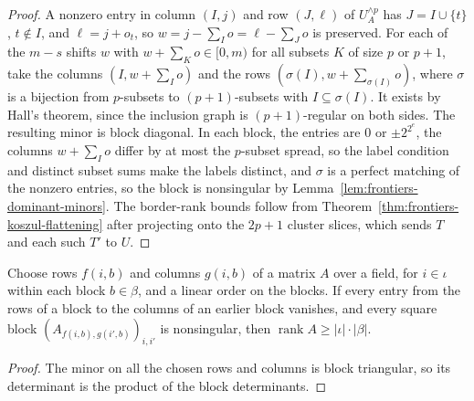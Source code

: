 \begin{proof}
  \leanok
  A nonzero entry in column $(I, j)$ and row $(J, \ell)$ of $U_A^{\wedge p}$ has
  $J = I \cup \{t\}$, $t \notin I$, and $\ell = j + o_t$, so
  $w = j - \sum_I o = \ell - \sum_J o$ is preserved. For each of the $m - s$ shifts $w$
  with $w + \sum_K o \in [0, m)$ for all subsets $K$ of size $p$ or $p + 1$, take the
  columns $(I, w + \sum_I o)$ and the rows $(\sigma(I), w + \sum_{\sigma(I)} o)$, where
  $\sigma$ is a bijection from $p$-subsets to $(p+1)$-subsets with $I \subseteq \sigma(I)$.
  It exists by Hall's theorem, since the inclusion graph is $(p+1)$-regular on both sides.
  The resulting minor is block diagonal. In each block, the entries are $0$ or
  $\pm 2^{2^{e}}$, the columns $w + \sum_I o$ differ by at most the $p$-subset spread, so
  the label condition and distinct subset sums make the labels distinct, and $\sigma$ is a
  perfect matching of the nonzero entries, so the block is nonsingular by
  Lemma~\ref{lem:frontiers-dominant-minors}. The border-rank bounds follow from
  Theorem~\ref{thm:frontiers-koszul-flattening} after projecting onto the $2p + 1$ cluster
  slices, which sends $T$ and each such $T'$ to $U$.
\end{proof}

\begin{lemma}
  \label{lem:frontiers-block-triangular-minors}
  \leanok
  Choose rows $f(i, b)$ and columns $g(i, b)$ of a matrix $A$ over a field, for $i \in \iota$
  within each block $b \in \beta$, and a linear order on the blocks. If every entry from the
  rows of a block to the columns of an earlier block vanishes, and every square block
  $(A_{f(i, b), g(i', b)})_{i, i'}$ is nonsingular, then
  $\operatorname{rank} A \ge |\iota| \cdot |\beta|$.
\end{lemma}
\begin{proof}
  \leanok
  The minor on all the chosen rows and columns is block triangular, so its determinant is
  the product of the block determinants.
\end{proof}

